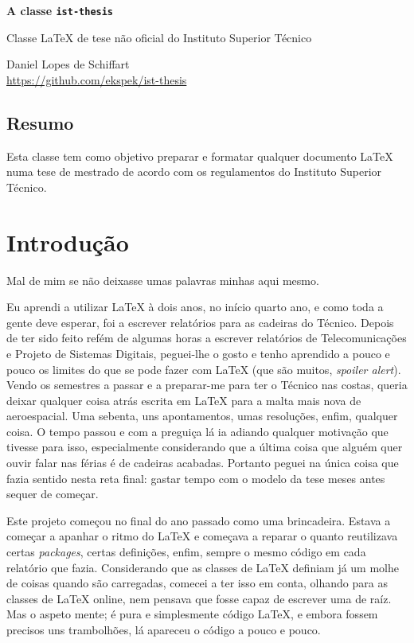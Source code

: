 \documentclass{../ist-thesis}
\begin{document}
\begin{center}
	{\Huge\bfseries A classe \texttt{ist-thesis}}
	\par\bigskip
	{\Large Classe \LaTeX{} de tese não oficial do Instituto Superior Técnico}
	\par\bigskip\smallskip
	Daniel Lopes de Schiffart \\
	\url{https://github.com/ekspek/ist-thesis}
\end{center}

\bigskip\bigskip

\begin{center}
	\section*{Resumo}
\end{center}
Esta classe tem como objetivo preparar e formatar qualquer documento \LaTeX{} numa tese de mestrado de acordo com os regulamentos do Instituto Superior Técnico.

\tableofcontents

\clearpage

\section*{Introdução}

Mal de mim se não deixasse umas palavras minhas aqui mesmo.

Eu aprendi a utilizar \LaTeX{} à dois anos, no início quarto ano, e como toda a gente deve esperar, foi a escrever relatórios para as cadeiras do Técnico. Depois de ter sido feito refém de algumas horas a escrever relatórios de Telecomunicações e Projeto de Sistemas Digitais, peguei-lhe o gosto e tenho aprendido a pouco e pouco os limites do que se pode fazer com \LaTeX{} (que são muitos, \textit{spoiler alert}). Vendo os semestres a passar e a preparar-me para ter o Técnico nas costas, queria deixar qualquer coisa atrás escrita em \LaTeX{} para a malta mais nova de aeroespacial. Uma sebenta, uns apontamentos, umas resoluções, enfim, qualquer coisa. O tempo passou e com a preguiça lá ia adiando qualquer motivação que tivesse para isso, especialmente considerando que a última coisa que alguém quer ouvir falar nas férias é de cadeiras acabadas. Portanto peguei na única coisa que fazia sentido nesta reta final: gastar tempo com o modelo da tese meses antes sequer de começar.

Este projeto começou no final do ano passado como uma brincadeira. Estava a começar a apanhar o ritmo do \LaTeX{} e começava a reparar o quanto reutilizava certas \textit{packages}, certas definições, enfim, sempre o mesmo código em cada relatório que fazia. Considerando que as classes de \LaTeX{} definiam já um molhe de coisas quando são carregadas, comecei a ter isso em conta, olhando para as classes de \LaTeX{} online, nem pensava que fosse capaz de escrever uma de raíz. Mas o aspeto mente; é pura e simplesmente código \LaTeX{}, e embora fossem precisos uns trambolhões, lá apareceu o código a pouco e pouco.
\end{document}
